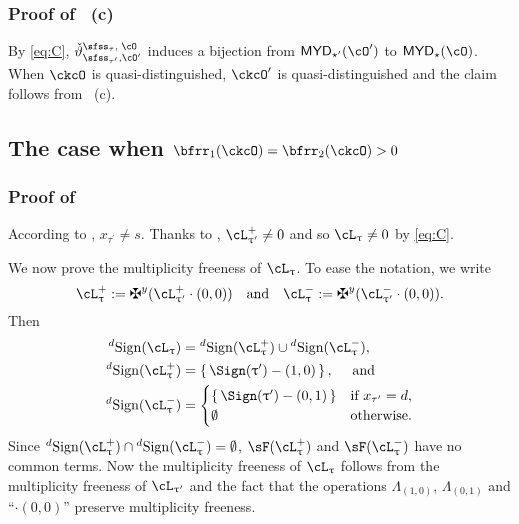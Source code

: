 \documentclass[12pt,a4paper]{amsart}
\def\MYD{{\mathsf{MYD}}}
\numberwithin{equation}{section}
\theoremstyle{remark}
\def\uptaup{\uptau^{\prime}}
\def\taup{\tau^{\prime}}
\begin{document}
\subsubsection*{Proof of ~(c)}
By \eqref{eq:C},  $\dlifttso$ induces a bijection from $\MYD_{\star'}(\cO')$ to
$\MYD_{\star}(\cO)$.
When $\ckcO$ is quasi-distinguished, $\ckcO'$ is quasi-distinguished
and the claim follows from
~(c).

\subsection*{The case when $\bfrr_{1}(\ckcO)=\bfrr_{2}(\ckcO)>0$}

\subsubsection*{Proof of }
According to ,  $x_{\taup}\neq s$.
Thanks to , $\pac{\uptaup} \neq 0$ and so $\ac_{\uptau}\neq 0$ by \eqref{eq:C}.

We now prove the multiplicity freeness of $\ac_{\uptau}$.
To ease the notation, we write
\[
 \pac{\uptau}:=\maltese^y (\pac{\uptau'}\cdot (0,0)) \AND
 \nac{\uptau}:=\maltese^y (\nac{\uptau'}\cdot (0,0)).
\]
Then
\begin{equation}
\label{eq:dsign1}
 \begin{split}
\dsign(\ac_{\uptau}) & = \dsign(\pac{\uptau})\cup \dsign(\nac{\uptau}), \\
\dsign(\pac{\uptau}) & = \set{\Sign(\uptau') - (1,0)}, \quad \text{ and }\\
\dsign(\nac{\uptau}) & =
\begin{cases}
\set{\Sign(\uptau') - (0,1)} & \text{if }  x_{\taup} =d, \\
\emptyset & \text{otherwise}. \\
\end{cases}
\end{split}
\end{equation}
Since $\dsign(\pac{\uptau})\cap \dsign(\nac{\uptau})=\emptyset$,
$\sF(\pac{\uptau})$ and $\sF(\nac{\uptau})$ have no common terms. Now the
multiplicity freeness of $\ac_{\uptau}$ follows from the multiplicity freeness
of $\ac_{\uptau'}$ and the fact that the operations $\Lambda_{(1,0)}$,
$\Lambda_{(0,1)}$ and ``$\cdot (0,0)$'' preserve
multiplicity freeness.


\smallskip
\end{document}
